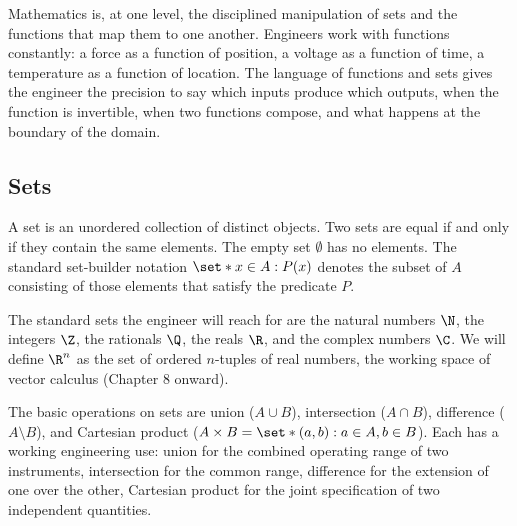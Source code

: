 Mathematics is, at one level, the disciplined manipulation of sets
and the functions that map them to one another. Engineers work with
functions constantly: a force as a function of position, a voltage
as a function of time, a temperature as a function of location. The
language of functions and sets gives the engineer the precision to
say which inputs produce which outputs, when the function is
invertible, when two functions compose, and what happens at the
boundary of the domain.

\subsection{Sets}

A set is an unordered collection of distinct objects. Two sets are
equal if and only if they contain the same elements. The empty set
$\emptyset$ has no elements. The standard set-builder notation
$\set*{x \in A : P(x)}$ denotes the subset of $A$ consisting of those
elements that satisfy the predicate $P$.

The standard sets the engineer will reach for are the natural numbers
$\N$, the integers $\Z$, the rationals $\Q$, the reals $\R$, and the
complex numbers $\C$. We will define $\R^{n}$ as the set of ordered
$n$-tuples of real numbers, the working space of vector calculus
(Chapter 8 onward).

The basic operations on sets are union ($A \cup B$), intersection
($A \cap B$), difference ($A \setminus B$), and Cartesian product
($A \times B = \set*{(a, b) : a \in A, b \in B}$). Each has a working
engineering use: union for the combined operating range of two
instruments, intersection for the common range, difference for the
extension of one over the other, Cartesian product for the joint
specification of two independent quantities.

